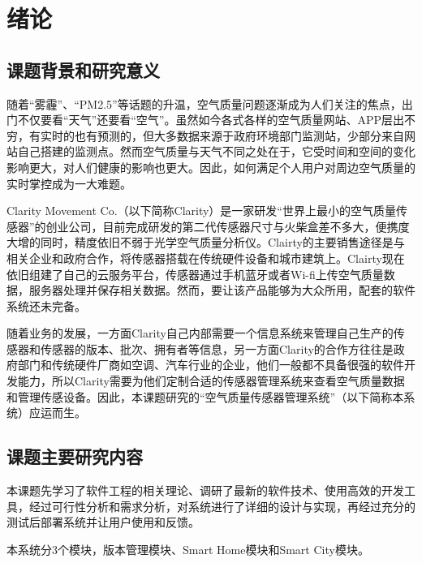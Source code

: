
\chapter{绪论}
\label{chap:intro}
\section{课题背景和研究意义}
随着“雾霾”、“PM2.5”等话题的升温，空气质量问题逐渐成为人们关注的焦点，出门不仅要看“天气”还要看“空气”。虽然如今各式各样的空气质量网站、APP层出不穷，有实时的也有预测的，但大多数据来源于政府环境部门监测站，少部分来自网站自己搭建的监测点。然而空气质量与天气不同之处在于，它受时间和空间的变化影响更大，对人们健康的影响也更大。因此，如何满足个人用户对周边空气质量的实时掌控成为一大难题。

Clarity Movement Co.（以下简称Clarity）是一家研发“世界上最小的空气质量传感器”的创业公司，目前完成研发的第二代传感器尺寸与火柴盒差不多大，便携度大增的同时，精度依旧不弱于光学空气质量分析仪。Clairty的主要销售途径是与相关企业和政府合作，将传感器搭载在传统硬件设备和城市建筑上。Clairty现在依旧组建了自己的云服务平台，传感器通过手机蓝牙或者Wi-fi上传空气质量数据，服务器处理并保存相关数据。然而，要让该产品能够为大众所用，配套的软件系统还未完备。

随着业务的发展，一方面Clarity自己内部需要一个信息系统来管理自己生产的传感器和传感器的版本、批次、拥有者等信息，另一方面Clarity的合作方往往是政府部门和传统硬件厂商如空调、汽车行业的企业，他们一般都不具备很强的软件开发能力，所以Clarity需要为他们定制合适的传感器管理系统来查看空气质量数据和管理传感设备。因此，本课题研究的“空气质量传感器管理系统”（以下简称本系统）应运而生。

\section{课题主要研究内容}
本课题先学习了软件工程的相关理论、调研了最新的软件技术、使用高效的开发工具，经过可行性分析和需求分析，对系统进行了详细的设计与实现，再经过充分的测试后部署系统并让用户使用和反馈。

本系统分3个模块，版本管理模块、Smart Home模块和Smart City模块。
